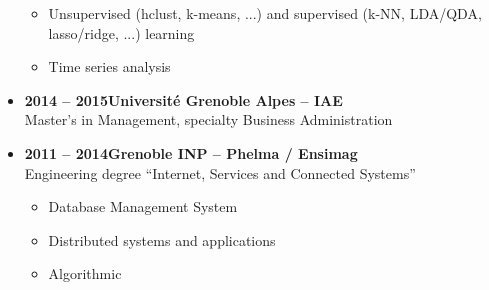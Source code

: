 \documentclass{article}
\begin{document}
\begin{minipage}{0.8\textwidth}
\begin{flushleft}
\begin{itemize}
\begin{itemize}[leftmargin=*]
            \item Unsupervised (hclust, k-means, ...) and supervised (k-NN, LDA/QDA, lasso/ridge, ...) learning
            \item Time series analysis
        \end{itemize}
        \item \textbf{2014 – 2015\qquad \qquad \qquad \qquad Université Grenoble Alpes – IAE} \\
        Master’s in Management, specialty Business Administration
        \item \textbf{2011 – 2014\qquad \qquad \qquad \qquad Grenoble INP – Phelma / Ensimag} \\
        Engineering degree “Internet, Services and Connected Systems”
        \vspace{-.15cm}
        \begin{itemize}[leftmargin=*]
        \setlength\itemsep{.01cm}
            \item Database Management System
            \item Distributed systems and applications
            \item Algorithmic
        \end{itemize}
    \end{itemize}

\end{flushleft}
\end{minipage}
\end{document}
